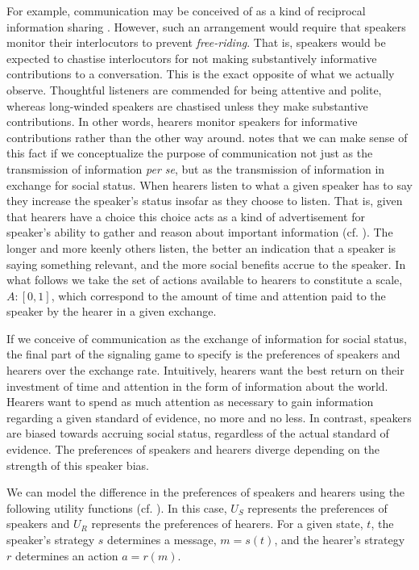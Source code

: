 \documentclass[linguex]{sp}
\theoremstyle{definition} \newtheorem{definition}{Definition}
\begin{document}
For example,  communication may be conceived of as a kind of  reciprocal information sharing \citep{trivers1971}. However, such an arrangement would require that speakers monitor their interlocutors to prevent \emph{free-riding}. That is, speakers would be expected to chastise interlocutors for not making substantively informative contributions to a conversation. This is the exact opposite of what we actually observe. Thoughtful listeners are commended for being attentive and polite, whereas long-winded speakers are chastised unless they make substantive contributions. In other words, hearers monitor speakers for informative contributions rather than the other way around. \cite{dessalles2007} notes that we can make sense of this fact if we conceptualize the purpose of communication not just as the transmission of information \emph{per se}, but as the transmission of information in exchange for social status.  When hearers listen to what a given speaker has to say they increase the speaker's status insofar as they choose to listen. That is, given that hearers have a choice this choice acts as a kind of advertisement for speaker's ability to gather and reason about important information (cf. \citealt{gintis2001,dessalles2014}).  The longer and more keenly others listen, the better an indication that a speaker is saying something relevant, and the more social benefits accrue to the speaker. In what follows we take the set of actions available to hearers to constitute a scale, $A : [0,1]$, which correspond to the amount of time and attention paid to the speaker by the hearer in a given exchange.

If we conceive of communication as the exchange of information for social status, the final part of the signaling game to specify is the preferences of speakers and hearers over the exchange rate. Intuitively, hearers want the best return on their investment of time and attention in the form of information about the world. Hearers want to spend as much attention as necessary to gain information regarding a given standard of evidence, no more and no less.  In contrast, speakers are biased towards accruing social status, regardless of the actual standard of evidence. The preferences of speakers and hearers diverge depending on the strength of this speaker bias. 

We can model the difference in the preferences of speakers and hearers  using the following utility functions (cf. \citealt{crawford-sobel:1982}). In this case, $U_S$ represents the preferences of speakers and $U_R$ represents the preferences of hearers. For a given state, $t$, the speaker's strategy $s$ determines a message, $m = s(t)$, and the hearer's strategy $r$ determines an action $a = r(m)$. 
\end{document}
